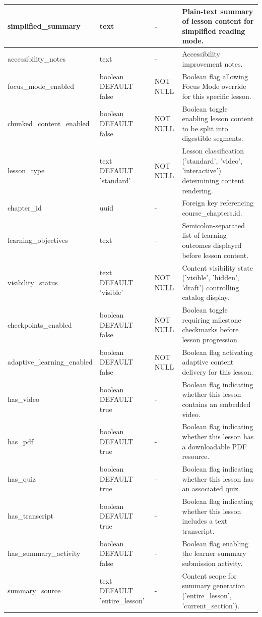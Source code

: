 \documentclass[12pt, oneside]{article} %
\newcommand{\tabbreak}{\hyphenpenalty=200\exhyphenpenalty=200\tolerance=4000\hbadness=10000\hspace{0pt}}
\begin{document}
{\begin{longtable}{|>{\raggedright\arraybackslash\tabbreak}p{2.67cm}|>{\raggedright\arraybackslash\tabbreak}p{2.93cm}|>{\raggedright\arraybackslash\tabbreak}p{2.67cm}|>{\raggedright\arraybackslash\tabbreak}p{4.51cm}|}
simplified\_summary & text & - & Plain-text summary of lesson content for simplified reading mode. \\ \hline
accessibility\_notes & text & - & Accessibility improvement notes. \\ \hline
focus\_mode\_enabled & boolean DEFAULT false & NOT NULL & Boolean flag allowing Focus Mode override for this specific lesson. \\ \hline
chunked\_content\_enabled & boolean DEFAULT false & NOT NULL & Boolean toggle enabling lesson content to be split into digestible segments. \\ \hline
lesson\_type & text DEFAULT 'standard' & NOT NULL & Lesson classification ('standard', 'video', 'interactive') determining content rendering. \\ \hline
chapter\_id & uuid & - & Foreign key referencing course\_chapters.id. \\ \hline
learning\_objectives & text & - & Semicolon-separated list of learning outcomes displayed before lesson content. \\ \hline
visibility\_status & text DEFAULT 'visible' & NOT NULL & Content visibility state ('visible', 'hidden', 'draft') controlling catalog display. \\ \hline
checkpoints\_enabled & boolean DEFAULT false & NOT NULL & Boolean toggle requiring milestone checkmarks before lesson progression. \\ \hline
adaptive\_learning\_enabled & boolean DEFAULT false & NOT NULL & Boolean flag activating adaptive content delivery for this lesson. \\ \hline
has\_video & boolean DEFAULT true & - & Boolean flag indicating whether this lesson contains an embedded video. \\ \hline
has\_pdf & boolean DEFAULT true & - & Boolean flag indicating whether this lesson has a downloadable PDF resource. \\ \hline
has\_quiz & boolean DEFAULT true & - & Boolean flag indicating whether this lesson has an associated quiz. \\ \hline
has\_transcript & boolean DEFAULT true & - & Boolean flag indicating whether this lesson includes a text transcript. \\ \hline
has\_summary\_activity & boolean DEFAULT false & - & Boolean flag enabling the learner summary submission activity. \\ \hline
summary\_source & text DEFAULT 'entire\_lesson' & - & Content scope for summary generation ('entire\_lesson', 'current\_section'). \\ \hline

\end{longtable}}
\end{document}
